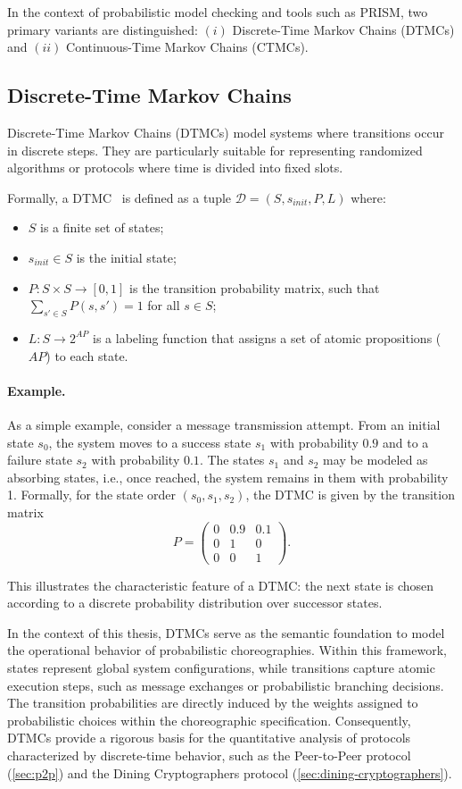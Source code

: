 In the context of probabilistic model checking and tools such as PRISM, two primary variants are distinguished: $(i)$ Discrete-Time Markov Chains (DTMCs) and $(ii)$ Continuous-Time Markov Chains (CTMCs).

\subsection*{Discrete-Time Markov Chains}
Discrete-Time Markov Chains (DTMCs) model systems where transitions occur in discrete steps. They are particularly suitable for representing randomized algorithms or protocols where time is divided into fixed slots. 

Formally, a DTMC~\cite{Baier2008Principles} is defined as a tuple $\mathcal{D} = (S, s_{\mathit{init}}, P, L)$ where: 
\begin{itemize}
	\item $S$ is a finite set of states;
	\item $s_{\mathit{init}} \in S$ is the initial state;
	\item $P: S \times S \rightarrow [0, 1]$ is the transition probability matrix, such that $\sum_{s' \in S} P(s, s') = 1$ for all $s \in S$;
	\item $L: S \rightarrow 2^{AP}$ is a labeling function that assigns a set of atomic propositions ($AP$) to each state.
\end{itemize}

\paragraph{Example.}
As a simple example, consider a message transmission attempt. From an initial state $s_0$, the system moves to a success state $s_1$ with probability $0.9$ and to a failure state $s_2$ with probability $0.1$. The states $s_1$ and $s_2$ may be modeled as absorbing states, i.e., once reached, the system remains in them with probability 1. Formally, for the state order $(s_{0}, s_{1}, s_{2})$, the DTMC is given by the transition matrix
\[
P =
\begin{pmatrix}
	0 & 0.9 & 0.1 \\
	0 & 1   & 0   \\
	0 & 0   & 1
\end{pmatrix}.
\]

This illustrates the characteristic feature of a DTMC: the next state is chosen according to a discrete probability distribution over successor states.

In the context of this thesis, DTMCs serve as the semantic foundation to model the operational behavior of probabilistic choreographies. Within this framework, states represent global system configurations, while transitions capture atomic execution steps, such as message exchanges or probabilistic branching decisions. The transition probabilities are directly induced by the weights assigned to probabilistic choices within the choreographic specification. Consequently, DTMCs provide a rigorous basis for the quantitative analysis of protocols characterized by discrete-time behavior, such as the Peer-to-Peer protocol (\cref{sec:p2p}) and the Dining Cryptographers protocol (\cref{sec:dining-cryptographers}).


